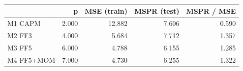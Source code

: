 \begin{tabular}{lrrrr}
\toprule
 & p & MSE (train) & MSPR (test) & MSPR / MSE \\
\midrule
M1 CAPM & 2.000 & 12.882 & 7.606 & 0.590 \\
M2 FF3 & 4.000 & 5.684 & 7.712 & 1.357 \\
M3 FF5 & 6.000 & 4.788 & 6.155 & 1.285 \\
M4 FF5+MOM & 7.000 & 4.730 & 6.255 & 1.322 \\
\bottomrule
\end{tabular}
